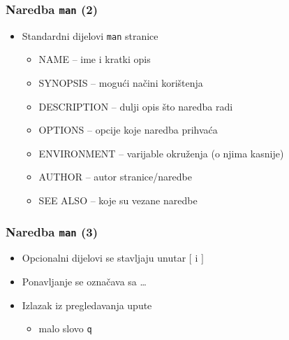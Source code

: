 \documentclass{beamer}
\newcommand{\shell}[1]{\texttt{#1}}
\begin{document}
\begin{frame}[t]
\frametitle{Naredba \shell{man} (2)}
\begin{itemize}
  \item Standardni dijelovi \shell{man} stranice
  \begin{itemize}
    \item NAME -- ime i kratki opis
    \item SYNOPSIS -- mogući načini korištenja
    \item DESCRIPTION -- dulji opis što naredba radi
    \item OPTIONS -- opcije koje naredba prihvaća
    \item ENVIRONMENT -- varijable okruženja (o njima kasnije)
    \item AUTHOR -- autor stranice/naredbe
    \item SEE ALSO -- koje su vezane naredbe
  \end{itemize}
\end{itemize}
\end{frame}

\begin{frame}[t]
\frametitle{Naredba \shell{man} (3)}
\begin{itemize}
  \item Opcionalni dijelovi se stavljaju unutar $[$ i $]$
  \item Ponavljanje se označava sa \ldots
  \item Izlazak iz pregledavanja upute
  \begin{itemize}
    \item malo slovo \shell{q}
  \end{itemize}
\end{itemize}
\end{frame}
\end{document}
